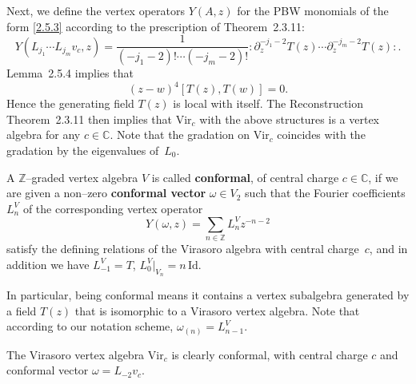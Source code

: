 \documentclass[12pt]{article}
\begin{document}
Next, we define the vertex operators $Y(A,z)$ for the PBW monomials
of the form \eqref{2.5.3} according to the prescription of
Theorem~2.3.11:
\[
    Y(L_{j_1}\cdots L_{j_m}v_c,z)
    = \frac{1}{(-j_1-2)!\cdots(-j_m-2)!}
    :\partial_z^{-j_1-2}T(z)\cdots \partial_z^{-j_m-2}T(z):.
\]
Lemma~2.5.4 implies that
\[
    (z-w)^4 [T(z),T(w)] = 0.
\]
Hence the generating field $T(z)$ is local with itself.
The Reconstruction Theorem~2.3.11 then implies that
$\mathrm{Vir}_c$ with the above structures is a vertex algebra
for any $c\in\mathbb{C}$.
Note that the gradation on $\mathrm{Vir}_c$ coincides with the gradation
by the eigenvalues of~$L_0$.

\begin{definition}
    A $\mathbb{Z}$--graded vertex algebra $V$ is called \textbf{conformal},
    of central charge $c\in\mathbb{C}$, if we are given a non--zero
    \textbf{conformal vector} $\omega\in V_2$ such that the Fourier coefficients
    $L^V_n$ of the corresponding vertex operator
    \begin{equation}\label{2.5.4}
        Y(\omega,z) = \sum_{n\in\mathbb{Z}} L^V_n z^{-n-2}
    \end{equation}
    satisfy the defining relations of the Virasoro algebra with central charge~$c$,
    and in addition we have $L^V_{-1} = T$, $L^V_0|_{V_n} = n\,\mathrm{Id}$.
\end{definition}
In particular, being conformal means it contains a vertex subalgebra generated by a field $T(z)$ that is isomorphic to a Virasoro vertex algebra. Note that according to our notation scheme,
$\omega_{(n)} = L^V_{n-1}$.
\begin{example}
    The Virasoro vertex algebra $\mathrm{Vir}_c$ is clearly conformal, with
    central charge $c$ and conformal vector $\omega = L_{-2}v_c$.
\end{example}
\end{document}
